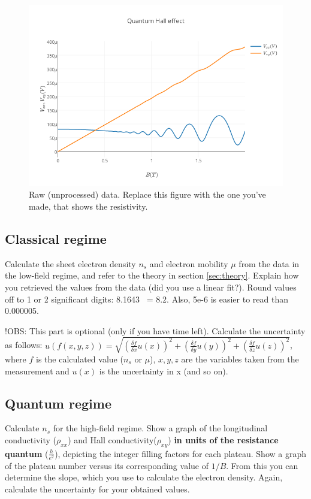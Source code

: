 \documentclass[a4paper]{article}
\begin{document}
\begin{figure}
\centering
\includegraphics[width=1\textwidth]{raw_data.png}
\caption{\label{fig:data}Raw (unprocessed) data. Replace this figure with the one you've made, that shows the resistivity.}
\end{figure}

\subsection{Classical regime}
Calculate the sheet electron density $n_{s}$ and electron mobility $\mu$ from the data in the low-field regime, and refer to the theory in section \ref{sec:theory}. Explain how you retrieved the values from the data (did you use a linear fit?).
Round values off to 1 or 2 significant digits: 8.1643 ~= 8.2. Also, 5e-6 is easier to read than 0.000005.

!OBS: This part is optional (only if you have time left).
Calculate the uncertainty as follows: \newline $u(f(x, y, z)) = \sqrt{(\frac{\delta f}{\delta{x}} u(x))^{2} + (\frac{\delta f}{\delta{y}} u(y))^{2} + (\frac{\delta f}{\delta{z}} u(z))^{2}}$, where $f$ is the calculated value ($n_{s}$ or $\mu$), $x, y, z$ are the variables taken from the measurement and $u(x)$ is the uncertainty in x (and so on).

\subsection{Quantum regime}
Calculate $n_{s}$ for the high-field regime.
Show a graph of the longitudinal conductivity ($\rho_{xx}$) and Hall conductivity($\rho_{xy}$) \textbf{in units of the resistance quantum} ($\frac{h}{e^{2}}$), depicting the integer filling factors for each plateau.
Show a graph of the plateau number versus its corresponding value of $1/B$. From this you can determine the slope, which you use to calculate the electron density.
Again, calculate the uncertainty for your obtained values.
\end{document}
